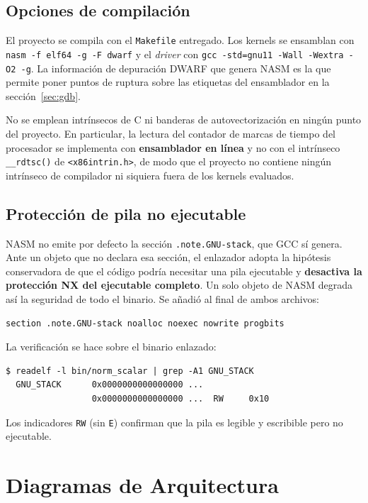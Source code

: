 \documentclass[journal]{IEEEtran}
\begin{document}
\subsection{Opciones de compilación}

El proyecto se compila con el \texttt{Makefile} entregado. Los kernels se
ensamblan con \texttt{nasm -f elf64 -g -F dwarf} y el \textit{driver} con
\texttt{gcc -std=gnu11 -Wall -Wextra -O2 -g}. La información de
depuración DWARF que genera NASM es la que permite poner puntos de
ruptura sobre las etiquetas del ensamblador en la sección~\ref{sec:gdb}.

No se emplean intrínsecos de C ni banderas de autovectorización en
ningún punto del proyecto. En particular, la lectura del contador de
marcas de tiempo del procesador se implementa con \textbf{ensamblador en
línea} y no con el intrínseco \texttt{\_\_rdtsc()} de
\texttt{<x86intrin.h>}, de modo que el proyecto no contiene ningún
intrínseco de compilador ni siquiera fuera de los kernels evaluados.

\subsection{Protección de pila no ejecutable}

NASM no emite por defecto la sección \texttt{.note.GNU-stack}, que GCC
sí genera. Ante un objeto que no declara esa sección, el enlazador
adopta la hipótesis conservadora de que el código podría necesitar
una pila ejecutable y \textbf{desactiva la protección NX del ejecutable
completo}. Un solo objeto de NASM degrada así la seguridad de todo el
binario. Se añadió al final de ambos archivos:

\begin{lstlisting}[caption={Declaración explícita de pila no
  ejecutable.}]
section .note.GNU-stack noalloc noexec nowrite progbits
\end{lstlisting}

La verificación se hace sobre el binario enlazado:

\begin{lstlisting}[style=shell]
$ readelf -l bin/norm_scalar | grep -A1 GNU_STACK
  GNU_STACK      0x0000000000000000 ...
                 0x0000000000000000 ...  RW     0x10
\end{lstlisting}

Los indicadores \texttt{RW} (sin \texttt{E}) confirman que la pila es
legible y escribible pero no ejecutable.


\section{Diagramas de Arquitectura}
\label{sec:diagramas}
\end{document}
